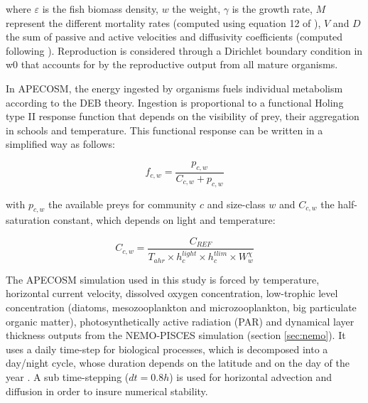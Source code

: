 where $\varepsilon$  is the fish biomass density, $w$ the weight, $\gamma$ is the growth rate, $M$ represent the different mortality rates (computed using equation 12 of \citealt{mauryIndividualsPopulationsCommunities2013}), $V$ and $D$ the sum of passive and active velocities and diffusivity coefficients (computed following \citealt{faugerasAdvectiondiffusionreactionSizestructuredFish2005}). Reproduction is considered through a Dirichlet boundary condition in w0 that accounts for by the reproductive output from all mature organisms.

In APECOSM, the energy ingested by organisms fuels individual metabolism according to the DEB theory. Ingestion is proportional to a functional Holing type II response function that depends on the visibility of prey, their aggregation in schools and temperature. This functional response can be written in a simplified way as follows:

\begin{displaymath}
f_{c, w} = \frac{p_{c, w}}{C_{c, w} + p_{c, w}}
\end{displaymath}

with $p_{c, w}$ the available preys for community $c$ and size-class $w$ and $C_{c, w}$ the half-saturation constant, which depends on light and temperature:


\begin{displaymath}
C_{c, w} = \frac{C_{REF}}{T_{ahr}\times h_c^{light}\times h_c^{tlim}\times W_{w}^{\chi}}
\end{displaymath}

The APECOSM simulation used in this study is forced by temperature, horizontal current velocity, dissolved oxygen concentration, low-trophic level concentration (diatoms, mesozooplankton and microzooplankton, big particulate organic matter), photosynthetically active radiation (PAR) and dynamical layer thickness outputs from the NEMO-PISCES simulation (section \ref{sec:nemo}). It uses a daily time-step for biological processes, which is decomposed into a day/night cycle, whose duration depends on the latitude and on the day of the year \citep{forsytheModelComparisonDaylength1995}. A sub time-stepping ($dt =0.8h$) is used for horizontal advection and diffusion in order to insure numerical stability.

